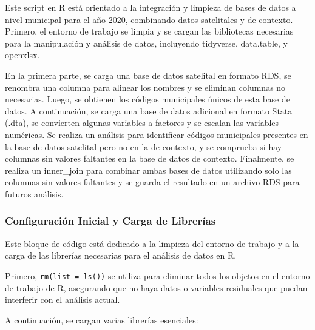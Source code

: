 \documentclass[
  12pt,
]{book}
\begin{document}
Este script en R está orientado a la integración y limpieza de bases de datos a nivel municipal para el año 2020, combinando datos satelitales y de contexto. Primero, el entorno de trabajo se limpia y se cargan las bibliotecas necesarias para la manipulación y análisis de datos, incluyendo tidyverse, data.table, y openxlsx.

En la primera parte, se carga una base de datos satelital en formato RDS, se renombra una columna para alinear los nombres y se eliminan columnas no necesarias. Luego, se obtienen los códigos municipales únicos de esta base de datos. A continuación, se carga una base de datos adicional en formato Stata (.dta), se convierten algunas variables a factores y se escalan las variables numéricas. Se realiza un análisis para identificar códigos municipales presentes en la base de datos satelital pero no en la de contexto, y se comprueba si hay columnas sin valores faltantes en la base de datos de contexto. Finalmente, se realiza un inner\_join para combinar ambas bases de datos utilizando solo las columnas sin valores faltantes y se guarda el resultado en un archivo RDS para futuros análisis.

\hypertarget{configuraciuxf3n-inicial-y-carga-de-libreruxedas}{%
\subsubsection*{Configuración Inicial y Carga de Librerías}\label{configuraciuxf3n-inicial-y-carga-de-libreruxedas}}

Este bloque de código está dedicado a la limpieza del entorno de trabajo y a la carga de las librerías necesarias para el análisis de datos en R.

Primero, \texttt{rm(list\ =\ ls())} se utiliza para eliminar todos los objetos en el entorno de trabajo de R, asegurando que no haya datos o variables residuales que puedan interferir con el análisis actual.

A continuación, se cargan varias librerías esenciales:
\end{document}
